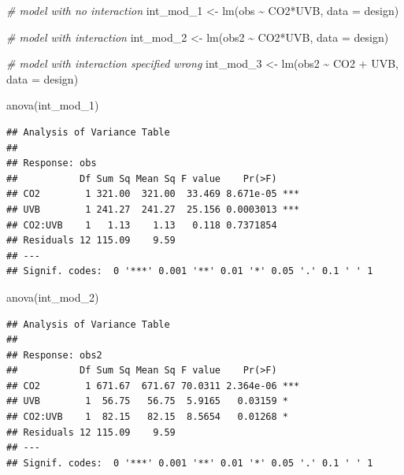 \documentclass[
]{book}
\newenvironment{Shaded}{\begin{snugshade}}{\end{snugshade}}
\newcommand{\AttributeTok}[1]{\textcolor[rgb]{0.77,0.63,0.00}{#1}}
\newcommand{\CommentTok}[1]{\textcolor[rgb]{0.56,0.35,0.01}{\textit{#1}}}
\newcommand{\FunctionTok}[1]{\textcolor[rgb]{0.00,0.00,0.00}{#1}}
\newcommand{\NormalTok}[1]{#1}
\newcommand{\OtherTok}[1]{\textcolor[rgb]{0.56,0.35,0.01}{#1}}
\newcommand{\SpecialCharTok}[1]{\textcolor[rgb]{0.00,0.00,0.00}{#1}}
\begin{document}
\begin{Shaded}
\begin{Highlighting}[]
\CommentTok{\# model with no interaction}
\NormalTok{int\_mod\_1 }\OtherTok{\textless{}{-}} \FunctionTok{lm}\NormalTok{(obs }\SpecialCharTok{\textasciitilde{}}\NormalTok{ CO2}\SpecialCharTok{*}\NormalTok{UVB, }\AttributeTok{data =}\NormalTok{ design)}

\CommentTok{\# model with interaction}
\NormalTok{int\_mod\_2 }\OtherTok{\textless{}{-}} \FunctionTok{lm}\NormalTok{(obs2 }\SpecialCharTok{\textasciitilde{}}\NormalTok{ CO2}\SpecialCharTok{*}\NormalTok{UVB, }\AttributeTok{data =}\NormalTok{ design)}

\CommentTok{\# model with interaction specified wrong}
\NormalTok{int\_mod\_3 }\OtherTok{\textless{}{-}} \FunctionTok{lm}\NormalTok{(obs2 }\SpecialCharTok{\textasciitilde{}}\NormalTok{ CO2 }\SpecialCharTok{+}\NormalTok{ UVB, }\AttributeTok{data =}\NormalTok{ design)}

\FunctionTok{anova}\NormalTok{(int\_mod\_1)}
\end{Highlighting}
\end{Shaded}

\begin{verbatim}
## Analysis of Variance Table
## 
## Response: obs
##           Df Sum Sq Mean Sq F value    Pr(>F)    
## CO2        1 321.00  321.00  33.469 8.671e-05 ***
## UVB        1 241.27  241.27  25.156 0.0003013 ***
## CO2:UVB    1   1.13    1.13   0.118 0.7371854    
## Residuals 12 115.09    9.59                      
## ---
## Signif. codes:  0 '***' 0.001 '**' 0.01 '*' 0.05 '.' 0.1 ' ' 1
\end{verbatim}

\begin{Shaded}
\begin{Highlighting}[]
\FunctionTok{anova}\NormalTok{(int\_mod\_2)}
\end{Highlighting}
\end{Shaded}

\begin{verbatim}
## Analysis of Variance Table
## 
## Response: obs2
##           Df Sum Sq Mean Sq F value    Pr(>F)    
## CO2        1 671.67  671.67 70.0311 2.364e-06 ***
## UVB        1  56.75   56.75  5.9165   0.03159 *  
## CO2:UVB    1  82.15   82.15  8.5654   0.01268 *  
## Residuals 12 115.09    9.59                      
## ---
## Signif. codes:  0 '***' 0.001 '**' 0.01 '*' 0.05 '.' 0.1 ' ' 1
\end{verbatim}
\end{document}
